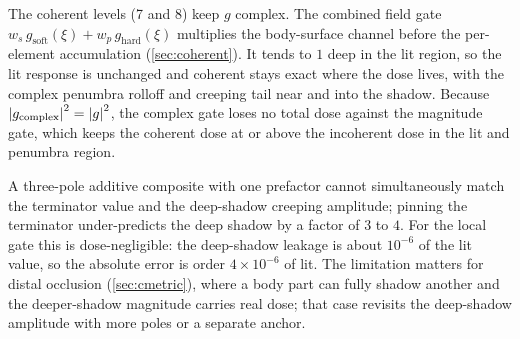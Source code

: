 The coherent levels (7 and 8) keep $g$ complex. The combined field gate
$w_s\,g_{\text{soft}}(\xi)+w_p\,g_{\text{hard}}(\xi)$ multiplies the body-surface
channel before the per-element accumulation (\cref{sec:coherent}). It tends to $1$
deep in the lit region, so the lit response is unchanged and coherent stays
exact where the dose lives, with the complex penumbra rolloff and creeping tail
near and into the shadow. Because $\abs{g_{\mathrm{complex}}}^2=\abs{g}^2$, the
complex gate loses no total dose against the magnitude gate, which keeps the
coherent dose at or above the incoherent dose in the lit and penumbra region.

\begin{remark}\label{rem:deep-shadow}
A three-pole additive composite with one prefactor cannot simultaneously match
the terminator value and the deep-shadow creeping amplitude; pinning the
terminator under-predicts the deep shadow by a factor of $3$ to $4$. For the
local gate this is dose-negligible: the deep-shadow leakage is about $10^{-6}$ of
the lit value, so the absolute error is order $4\times10^{-6}$ of lit. The
limitation matters for distal occlusion (\cref{sec:cmetric}), where a body part
can fully shadow another and the deeper-shadow magnitude carries real dose; that
case revisits the deep-shadow amplitude with more poles or a separate anchor.
\end{remark}
